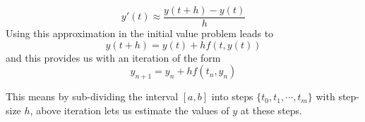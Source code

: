 \documentclass[17pt]{extarticle}
\begin{document}
	$$
	y'(t)\approx \frac{y(t+h)-y(t)}{h}
	$$
	Using this approximation in the initial value problem leads to
	$$
	y(t+h)=y(t)+hf(t,y(t))
	$$
	and this provides us with an iteration of the form
	$$
	y_{n+1}=y_{n}+hf(t_n, y_n)
	$$

This means by sub-dividing the interval $[a,b]$ into steps $\{t_0, t_1, \cdots, t_m\}$ with step-size $h$, above iteration lets us estimate the values of $y$ at these steps.
\end{document}
